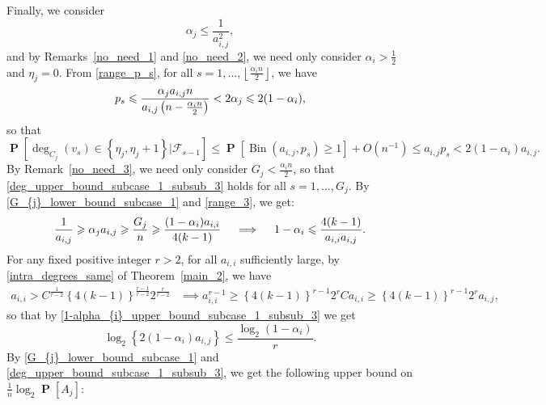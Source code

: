 \documentclass[11pt,reqno]{amsart}
\theoremstyle{definition}
\theoremstyle{remark}
\theoremstyle{conjecture}
\DeclareMathOperator{\Prob}{\mathbf{P}}
\DeclareMathOperator{\bin}{Bin}
\begin{document}
Finally, we consider 
\begin{equation}\label{range_3}
\alpha_{j} \leqslant \frac{1}{a_{i,j}^{2}},
\end{equation}
and by Remarks~\ref{no_need_1} and \ref{no_need_2}, we need only consider $\alpha_{i} > \frac{1}{2}$ and $\eta_{j} = 0$. From \eqref{range_p_s}, for all $s = 1, \ldots, \left\lfloor\frac{\alpha_{i} n}{2}\right\rfloor$, we have 
\begin{equation}\label{p_{s}_upper_bound_subcase_1_subsub_3}
p_{s} \leqslant \frac{\alpha_{j} a_{i,j} n}{a_{i,j} \left(n - \frac{\alpha_{i} n}{2}\right)} < 2 \alpha_{j} \leqslant 2(1-\alpha_{i}), \nonumber
\end{equation}
so that 
\begin{equation}\label{deg_upper_bound_subcase_1_subsub_3}
\Prob\left[\deg_{C_{j}}(v_{s}) \in \left\{\eta_{j}, \eta_{j}+1\right\}\Big|\mathcal{F}_{s-1}\right] \leqslant \Prob\left[\bin\left(a_{i,j}, p_{s}\right) \geqslant 1\right] + O(n^{-1}) \leqslant a_{i,j} p_{s} < 2 (1-\alpha_{i}) a_{i,j}.
\end{equation}
By Remark~\ref{no_need_3}, we need only consider $G_{j} < \frac{\alpha_{i} n}{2}$, so that \eqref{deg_upper_bound_subcase_1_subsub_3} holds for all $s = 1, \dots, G_{j}$. By \eqref{G_{j}_lower_bound_subcase_1} and \eqref{range_3}, we get:
\begin{equation}\label{1-alpha_{i}_upper_bound_subcase_1_subsub_3}
\frac{1}{a_{i,j}} \geqslant \alpha_{j} a_{i,j} \geqslant \frac{G_{j}}{n} \geqslant \frac{(1-\alpha_{i}) a_{i,i}}{4(k-1)} \quad \implies \quad 1-\alpha_{i}  \leqslant \frac{4(k-1)}{a_{i,i} a_{i,j}}.
\end{equation}
For any fixed positive integer $r > 2$, for all $a_{i,i}$ sufficiently large, by \ref{intra_degrees_same} of Theorem~\ref{main_2}, we have
\begin{align}%
a_{i,i} > C^{\frac{1}{r-2}} \left\{4(k-1)\right\}^{\frac{r-1}{r-2}} 2^{\frac{r}{r-2}} &\implies a_{i,i}^{r-1} \geqslant \left\{4(k-1)\right\}^{r-1} 2^{r} C a_{i,i} \geqslant \left\{4(k-1)\right\}^{r-1} 2^{r} a_{i,j}, \nonumber
\end{align}
so that by \eqref{1-alpha_{i}_upper_bound_subcase_1_subsub_3} we get 
\begin{equation}\label{log_upper_bound_subcase_1_subsub_3}
\log_{2}\left\{2 (1-\alpha_{i}) a_{i,j}\right\} \leqslant \frac{\log_{2}(1-\alpha_{i})}{r}.
\end{equation}
By \eqref{G_{j}_lower_bound_subcase_1} and \eqref{deg_upper_bound_subcase_1_subsub_3}, we get the following upper bound on $\frac{1}{n} \log_{2} \Prob[A_{j}]$:
\end{document}

